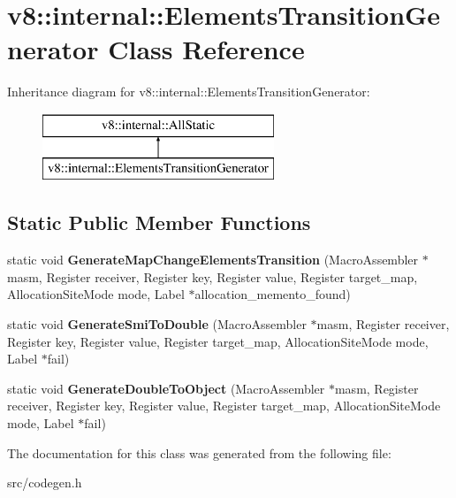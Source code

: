 \hypertarget{classv8_1_1internal_1_1_elements_transition_generator}{}\section{v8\+:\+:internal\+:\+:Elements\+Transition\+Generator Class Reference}
\label{classv8_1_1internal_1_1_elements_transition_generator}
Inheritance diagram for v8\+:\+:internal\+:\+:Elements\+Transition\+Generator\+:\begin{figure}[H]
\begin{center}
\leavevmode
\includegraphics[height=2.000000cm]{classv8_1_1internal_1_1_elements_transition_generator}
\end{center}
\end{figure}
\subsection*{Static Public Member Functions}
\begin{DoxyCompactItemize}
\item 
\hypertarget{classv8_1_1internal_1_1_elements_transition_generator_a911b2631ec80409c2038f11df1e8a2b5}{}static void {\bfseries Generate\+Map\+Change\+Elements\+Transition} (Macro\+Assembler $\ast$masm, Register receiver, Register key, Register value, Register target\+\_\+map, Allocation\+Site\+Mode mode, Label $\ast$allocation\+\_\+memento\+\_\+found)\label{classv8_1_1internal_1_1_elements_transition_generator_a911b2631ec80409c2038f11df1e8a2b5}

\item 
\hypertarget{classv8_1_1internal_1_1_elements_transition_generator_a69f00e6bde4e084ccfed2a4905f0bf1d}{}static void {\bfseries Generate\+Smi\+To\+Double} (Macro\+Assembler $\ast$masm, Register receiver, Register key, Register value, Register target\+\_\+map, Allocation\+Site\+Mode mode, Label $\ast$fail)\label{classv8_1_1internal_1_1_elements_transition_generator_a69f00e6bde4e084ccfed2a4905f0bf1d}

\item 
\hypertarget{classv8_1_1internal_1_1_elements_transition_generator_aa9fe2794bc101acf06608aa26109615a}{}static void {\bfseries Generate\+Double\+To\+Object} (Macro\+Assembler $\ast$masm, Register receiver, Register key, Register value, Register target\+\_\+map, Allocation\+Site\+Mode mode, Label $\ast$fail)\label{classv8_1_1internal_1_1_elements_transition_generator_aa9fe2794bc101acf06608aa26109615a}

\end{DoxyCompactItemize}


The documentation for this class was generated from the following file\+:\begin{DoxyCompactItemize}
\item 
src/codegen.\+h\end{DoxyCompactItemize}
